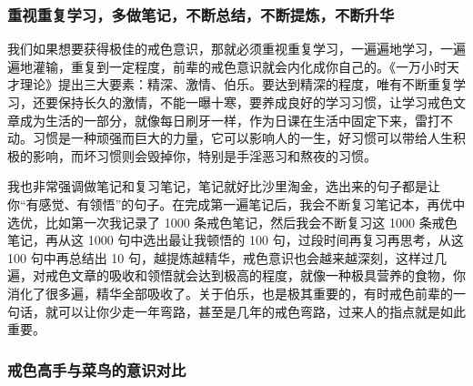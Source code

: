 \subsubsection{重视重复学习，多做笔记，不断总结，不断提炼，不断升华}

我们如果想要获得极佳的戒色意识，那就必须重视重复学习，一遍遍地学习，一遍遍地灌输，重复到一定程度，前辈的戒色意识就会内化成你自己的。《一万小时天才理论》提出三大要素：精深、激情、伯乐。要达到精深的程度，唯有不断重复学习，还要保持长久的激情，不能一曝十寒，要养成良好的学习习惯，让学习戒色文章成为生活的一部分，就像每日刷牙一样，作为日课在生活中固定下来，雷打不动。习惯是一种顽强而巨大的力量，它可以影响人的一生，好习惯可以带给人生积极的影响，而坏习惯则会毁掉你，特别是手淫恶习和熬夜的习惯。

我也非常强调做笔记和复习笔记，笔记就好比沙里淘金，选出来的句子都是让你“有感觉、有领悟”的句子。在完成第一遍笔记后，我会不断复习笔记本，再优中选优，比如第一次我记录了 1000 条戒色笔记，然后我会不断复习这 1000 条戒色笔记，再从这 1000 句中选出最让我顿悟的 100 句，过段时间再复习再思考，从这 100 句中再总结出 10 句，越提炼越精华，戒色意识也会越来越深刻，这样过几遍，对戒色文章的吸收和领悟就会达到极高的程度，就像一种极具营养的食物，你消化了很多遍，精华全部吸收了。关于伯乐，也是极其重要的，有时戒色前辈的一句话，就可以让你少走一年弯路，甚至是几年的戒色弯路，过来人的指点就是如此重要。

\subsubsection{戒色高手与菜鸟的意识对比}

